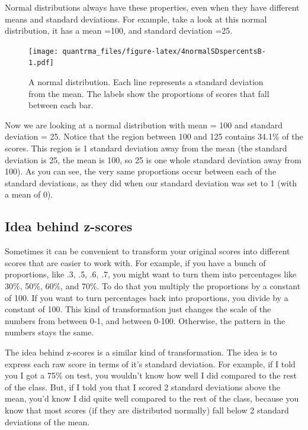 \documentclass[
]{book}
\begin{document}
Normal distributions always have these properties, even when they have different means and standard deviations. For example, take a look at this normal distribution, it has a mean =100, and standard deviation =25.

\begin{figure}
\centering
\texttt{[image: quantrma\_files/figure-latex/4normalSDspercentsB-1.pdf]}
\caption{\label{fig:4normalSDspercentsB}A normal distribution. Each line represents a standard deviation from the mean. The labels show the proportions of scores that fall between each bar.}
\end{figure}

Now we are looking at a normal distribution with mean = 100 and standard deviation = 25. Notice that the region between 100 and 125 contains 34.1\% of the scores. This region is 1 standard deviation away from the mean (the standard deviation is 25, the mean is 100, so 25 is one whole standard deviation away from 100). As you can see, the very same proportions occur between each of the standard deviations, as they did when our standard deviation was set to 1 (with a mean of 0).

\hypertarget{idea-behind-z-scores}{%
\subsection{Idea behind z-scores}\label{idea-behind-z-scores}}

Sometimes it can be convenient to transform your original scores into different scores that are easier to work with. For example, if you have a bunch of proportions, like .3, .5, .6, .7, you might want to turn them into percentages like 30\%, 50\%, 60\%, and 70\%. To do that you multiply the proportions by a constant of 100. If you want to turn percentages back into proportions, you divide by a constant of 100. This kind of transformation just changes the scale of the numbers from between 0-1, and between 0-100. Otherwise, the pattern in the numbers stays the same.

The idea behind z-scores is a similar kind of transformation. The idea is to express each raw score in terms of it's standard deviation. For example, if I told you I got a 75\% on test, you wouldn't know how well I did compared to the rest of the class. But, if I told you that I scored 2 standard deviations above the mean, you'd know I did quite well compared to the rest of the class, because you know that most scores (if they are distributed normally) fall below 2 standard deviations of the mean.
\end{document}
